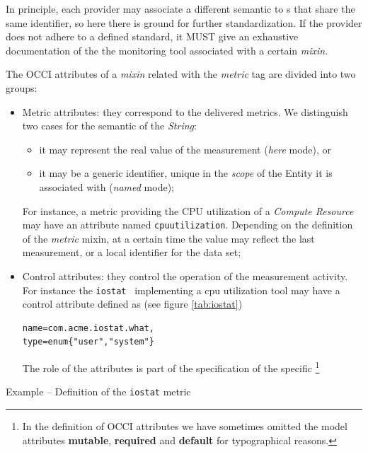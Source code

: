 \documentclass[10pt]{article}  %
\begin{document}
\newcommand{\misem}[1]{In principle, each provider may associate a different semantic to \mi s that share the same identifier, so here there is ground for further standardization. If the provider does not adhere to a defined standard, it MUST give an exhaustive documentation of the #1 associated with a certain {\em mixin}.}

\misem{the monitoring tool}

The OCCI attributes of a {\em mixin} related with the {\em metric} tag are divided into two groups:
\begin{itemize}

\item Metric attributes: they correspond to the delivered metrics. We distinguish two cases for the semantic of the {\em String}:
\begin{itemize}
\item it may represent the real value of the measurement ({\em here} mode), or
\item it may be a generic identifier, unique in the {\em scope} of the Entity it is associated with ({\em named} mode);
\end{itemize}
For instance, a metric providing the CPU utilization of a {\em Compute Resource} may have an attribute named {\tt \small cpuutilization}. Depending on the definition of the {\em metric} mixin, at a certain time the value may reflect the last measurement, or a local identifier for the data set;
\item Control attributes: they control the operation of the measurement activity. For instance the {\tt \small iostat} \mi\ implementing a cpu utilization tool may have a control attribute defined as (see figure \ref{tab:iostat}) 

\begin{verbatim}
name=com.acme.iostat.what,
type=enum{"user","system"}
\end{verbatim}

The role of the attributes is part of the specification of the specific \mi \footnote{In the definition of OCCI attributes we have sometimes omitted the model attributes {\bf mutable}, {\bf required} and {\bf default} for typographical reasons.}

\end{itemize}

\begin{table}
\caption{Example -- Definition of the {\tt \small iostat} metric \mi \label{tab:iostat} }  
\end{table}
\end{document}

